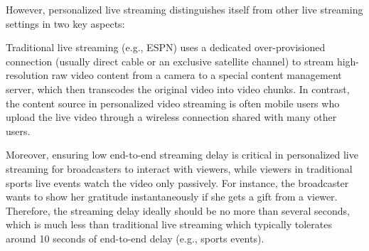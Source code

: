 
However, personalized live streaming distinguishes itself from 
other live streaming settings in two key aspects:

Traditional live streaming (e.g., ESPN) uses a dedicated
over-provisioned connection (usually direct cable or an exclusive
satellite channel) to stream high-resolution raw video
content from a camera to a special content management
server, which then transcodes the original video into video chunks.
In contrast, the content source in personalized video
streaming is often mobile users who upload the live video
through a wireless connection shared with many other users.

Moreover, ensuring low end-to-end streaming delay is critical
in personalized live streaming for broadcasters
to interact with viewers, while viewers in traditional sports live
events watch the video only passively.
For instance, the broadcaster wants to show her gratitude 
instantaneously if she gets a gift from a viewer.
Therefore, the streaming delay ideally should be no more than
several seconds, which is much less than traditional live
streaming which typically tolerates around 10 seconds of end-to-end 
delay (e.g., sports events).

